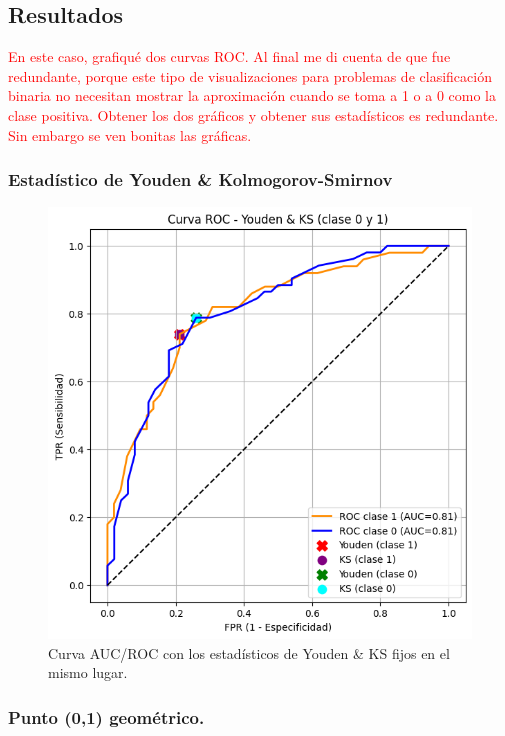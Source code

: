 
\subsection{Resultados}
\textcolor{red}{
En este caso, grafiqué dos curvas ROC. Al final me di cuenta de que fue redundante, porque este tipo de visualizaciones para problemas de clasificación binaria no necesitan mostrar
la aproximación cuando se toma a 1 o a 0 como la clase positiva. Obtener los dos gráficos y obtener
sus estadísticos es redundante. Sin embargo se ven bonitas las gráficas.}
\clearpage

    \subsubsection{Estadístico de Youden \& Kolmogorov-Smirnov}

        \begin{figure}[h!]
            \centering
            \includegraphics[width=0.7\linewidth]{Images/youden-ks-roc.png}
            \caption{Curva AUC/ROC con los estadísticos de Youden \& KS fijos en el mismo lugar.}
            \label{fig:youden-ks-roc}
        \end{figure}
        \clearpage

    \subsubsection{Punto (0,1) geométrico.}

